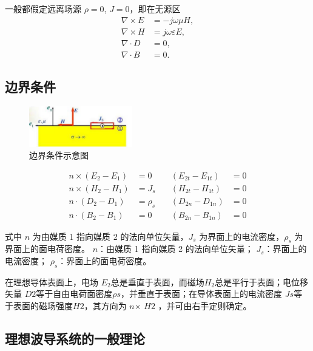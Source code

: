 一般都假定远离场源 $\rho = 0$, $J = 0$，即在无源区
\[
\begin{aligned}
	\nabla \times E &= -j \omega \mu H, \\
	\nabla \times H &= j \omega \varepsilon E, \\
	\nabla \cdot D &= 0, \\
	\nabla \cdot B &= 0.
\end{aligned}
\tag{3-1-3}
\]

\subsection{边界条件}

\begin{figure}[htbp]
	\centering
	\includegraphics[width=0.4\textwidth]{img/3-5.png} %
	\caption{边界条件示意图}
	\label{fig:example}
\end{figure}

\begin{equation}
	\begin{aligned}
		n \times (E_2 - E_1) &= 0 & \quad (E_{2t} - E_{1t}) &= 0 \\
		n \times (H_2 - H_1) &= J_s & \quad (H_{2t} - H_{1t}) &= 0 \\
		n \cdot (D_2 - D_1) &= \rho_s & \quad (D_{2n} - D_{1n}) &= 0 \\
		n \cdot (B_2 - B_1) &= 0 & \quad (B_{2n} - B_{1n}) &= 0
	\end{aligned}
	\tag{3-2-1}
\end{equation}

式中 $ n $ 为由媒质 1 指向媒质 2 的法向单位矢量，$ J_s $ 为界面上的电流密度，$ \rho_s $ 为界面上的面电荷密度。
$ n $：由媒质 1 指向媒质 2 的法向单位矢量；
$ J_s $：界面上的电流密度；
$ \rho_s $：界面上的面电荷密度。

在理想导体表面上，电场 $E_2$​总是垂直于表面，而磁场$ H_2​$总是平行于表面；电位移矢量 $D 2​$等于自由电荷面密度$ ρ s​$，并垂直于表面；在导体表面上的电流密度 $J s$等于表面的磁场强度$ H 2​$，其方向为 $n$× $H 2$ ，并可由右手定则确定。


\subsection{理想波导系统的一般理论}

